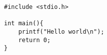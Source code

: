 \begin{verbatim}
#include <stdio.h>

int main(){
    printf("Hello world\n");
    return 0;
}
\end{verbatim}
